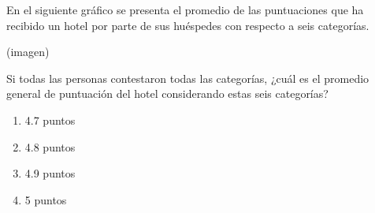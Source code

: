 \begin{problem}
    En el siguiente gráfico se presenta el promedio de las puntuaciones que ha recibido un hotel por parte de sus huéspedes con respecto a seis categorías.

    \begin{center}
    (imagen)
    \end{center}

    Si todas las personas contestaron todas las categorías, ¿cuál es el promedio general de puntuación del hotel considerando estas seis categorías?

    \begin{enumerate}[label=\Alph*.]
        \item 4.7 puntos
        \item 4.8 puntos
        \item 4.9 puntos
        \item 5 puntos
    \end{enumerate}
\end{problem}
